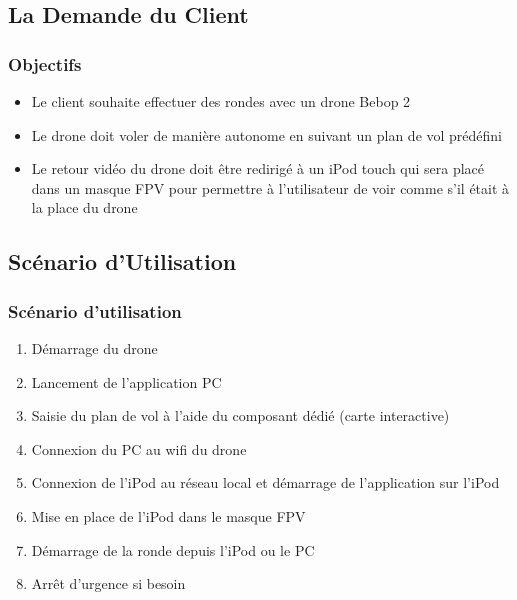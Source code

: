 \documentclass{beamer}
\begin{document}
	\begin{frame}
		\section{La Demande du Client}
		\begin{center}
		\frametitle{Objectifs}
		\begin{itemize}
		    \item Le client souhaite effectuer des rondes avec un drone Bebop 2\\
		    \item Le drone doit voler de manière autonome en suivant un plan de vol prédéfini \\
		    \item Le retour vidéo du drone doit être redirigé à un iPod touch qui sera placé dans un masque FPV pour permettre à l'utilisateur de voir comme s'il était à la place du drone\\
		\end{itemize}
		   
		\end{center}
	\end{frame}
	\begin{frame}
		\section{Scénario d'Utilisation}
		\begin{center}
		\frametitle{Scénario d'utilisation}
		\begin{enumerate}
		    \item Démarrage du drone\\
		    \item Lancement de l'application PC\\
		    \item Saisie du plan de vol à l'aide du composant dédié (carte interactive)\\
		    \item Connexion du PC au wifi du drone
		    \item Connexion de l'iPod au réseau local et démarrage de l'application sur l'iPod
		    \item Mise en place de l'iPod dans le masque FPV
		    \item Démarrage de la ronde depuis l'iPod ou le PC
		    \item Arrêt d'urgence si besoin
		\end{enumerate}
		   
		\end{center}
	\end{frame}
	
\end{document}
